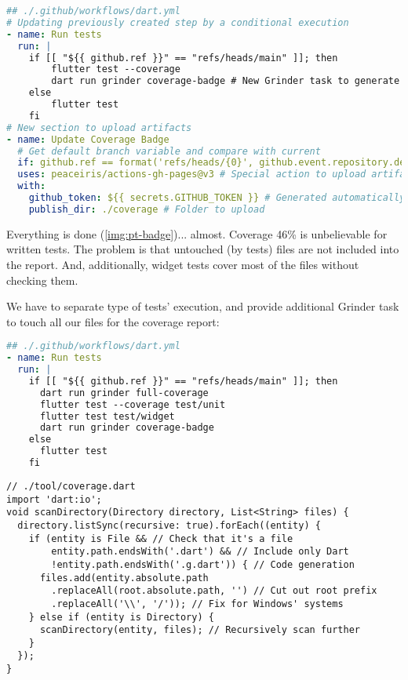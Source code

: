 \begin{lstlisting}[language=yaml]
## ./.github/workflows/dart.yml
# Updating previously created step by a conditional execution
- name: Run tests
  run: |
    if [[ "${{ github.ref }}" == "refs/heads/main" ]]; then
        flutter test --coverage
        dart run grinder coverage-badge # New Grinder task to generate '.svg'-file with coverage
    else
        flutter test
    fi
# New section to upload artifacts
- name: Update Coverage Badge
  # Get default branch variable and compare with current
  if: github.ref == format('refs/heads/{0}', github.event.repository.default_branch)
  uses: peaceiris/actions-gh-pages@v3 # Special action to upload artifacts
  with:
    github_token: ${{ secrets.GITHUB_TOKEN }} # Generated automatically by GitHub
    publish_dir: ./coverage # Folder to upload
\end{lstlisting}


\noindent Everything is done (\cref{img:pt-badge})... almost. Coverage 46\% is unbelievable for written tests. The 
problem is that untouched (by tests) files are not included into the report. And, additionally, widget tests cover 
most of the files without checking them. 

We have to separate type of tests' execution, and provide additional Grinder task to touch all our files for the 
coverage report:

\begin{lstlisting}[language=yaml]
## ./.github/workflows/dart.yml
- name: Run tests
  run: |
    if [[ "${{ github.ref }}" == "refs/heads/main" ]]; then
      dart run grinder full-coverage
      flutter test --coverage test/unit
      flutter test test/widget
      dart run grinder coverage-badge
    else
      flutter test
    fi
\end{lstlisting}

\begin{lstlisting}
// ./tool/coverage.dart
import 'dart:io';
void scanDirectory(Directory directory, List<String> files) {
  directory.listSync(recursive: true).forEach((entity) {
    if (entity is File && // Check that it's a file
        entity.path.endsWith('.dart') && // Include only Dart
        !entity.path.endsWith('.g.dart')) { // Code generation
      files.add(entity.absolute.path
        .replaceAll(root.absolute.path, '') // Cut out root prefix
        .replaceAll('\\', '/')); // Fix for Windows' systems
    } else if (entity is Directory) {
      scanDirectory(entity, files); // Recursively scan further
    }
  });
}
\end{lstlisting}


